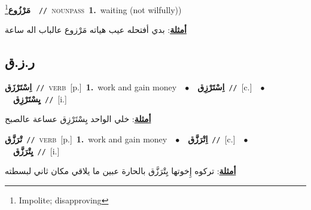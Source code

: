 \documentclass[10pt,a4paper,twoside]{article} %
\begin{document}
\begin{multicols}{2}
{\setlength\topsep{0pt}\textbf{\foreignlanguage{arabic}{مَرْزُوع}}\footnote{Impolite; disapproving}\ \ {\color{gray}\texttt{//}\color{black}}\ \textsc{noun\textunderscore pass}\ \textbf{1.}~waiting (not wilfully))\  \begin{flushright}\color{gray}\foreignlanguage{arabic}{\textbf{\underline{\foreignlanguage{arabic}{أمثلة}}}: بدي أفتحله عيب هياته مَرْزوع عالباب اله ساعة}\end{flushright}\color{black}} \vspace{2mm}

\vspace{-3mm}
\subsection*{\color{blue}\foreignlanguage{arabic}{ر.ز.ق}\color{blue}{}} 

{\setlength\topsep{0pt}\textbf{\foreignlanguage{arabic}{اِسْتَرْزَق}}\ {\color{gray}\texttt{//}\color{black}}\ \textsc{verb}\ [p.]\ \textbf{1.}~work and gain money\ \ $\bullet$\ \ \setlength\topsep{0pt}\textbf{\foreignlanguage{arabic}{اِسْتَرْزِق}}\ {\color{gray}\texttt{//}\color{black}}\ [c.]\ \ $\bullet$\ \ \setlength\topsep{0pt}\textbf{\foreignlanguage{arabic}{يِسْتَرْزِق}}\ {\color{gray}\texttt{//}\color{black}}\ [i.]\  \begin{flushright}\color{gray}\foreignlanguage{arabic}{\textbf{\underline{\foreignlanguage{arabic}{أمثلة}}}: خلي الواحد يِسْتَرْزِق عساعة عالصبح}\end{flushright}\color{black}} \vspace{2mm}

{\setlength\topsep{0pt}\textbf{\foreignlanguage{arabic}{تْرَزَّق}}\ {\color{gray}\texttt{//}\color{black}}\ \textsc{verb}\ [p.]\ \textbf{1.}~work and gain money\ \ $\bullet$\ \ \setlength\topsep{0pt}\textbf{\foreignlanguage{arabic}{اِتْرَزَّق}}\ {\color{gray}\texttt{//}\color{black}}\ [c.]\ \ $\bullet$\ \ \setlength\topsep{0pt}\textbf{\foreignlanguage{arabic}{يِتْرَزَّق}}\ {\color{gray}\texttt{//}\color{black}}\ [i.]\  \begin{flushright}\color{gray}\foreignlanguage{arabic}{\textbf{\underline{\foreignlanguage{arabic}{أمثلة}}}: تركوه إِخوتها يِتْرَزَّق بالحارة عبين ما يلاقي مكان ثاني لبسطته}\end{flushright}\color{black}} \vspace{2mm}


\end{multicols}
\end{document}
